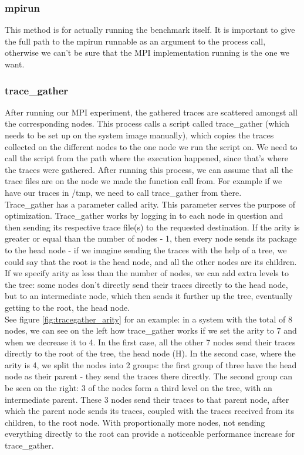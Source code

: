 \subsubsection{mpirun}
This method is for actually running the benchmark
itself. It is important to give the full path to the mpirun runnable
as an argument to the process call, otherwise we can't be sure that
the MPI implementation running is the one we want.
\subsubsection{trace\_gather}
\label{sec:trace_gather}
After running our MPI experiment, the gathered traces are scattered
amongst all the corresponding nodes. This process calls a script
called trace\_gather\cite{ms11} (which needs to be set up on the system
image manually), which copies the traces collected on the
different nodes to the one node we run the script on. We need to call
the script from the path where the execution happened, since that's
where the traces were gathered. After running
this process, we can assume that all the trace files are on the node
we made the function call from. For example if we have our traces in
/tmp, we need to call trace\_gather from there.\\
Trace\_gather has a parameter called arity. This parameter serves the
purpose of optimization. Trace\_gather
works by logging in to each node in question and then sending its
respective trace file(s) to the requested destination. If the arity is
greater or equal than the number of nodes - 1, then every node sends
its package to the head node - if we imagine sending the traces with
the help of a tree, we could say that the root is the head node, and
all the other nodes are its children. If we specify arity as less than
the number of nodes, we can add extra levels to the tree: some nodes
don't directly send their traces directly to the head node, but to an
intermediate node, which then sends it further up the tree, eventually
getting to the root, the head node.\\
See figure \ref{fig:tracegather_arity} for an example: in a system
with the total of 8 nodes, we can see on the left how trace\_gather
works if we set the arity to 7 and when we decrease it to 4. In the
first case, all the other 7 nodes send their traces directly to the
root of the tree, the head node (H). In the second case, where the
arity is 4, we split the nodes into 2 groups: the first group of three
have the head node as their parent - they send the traces there
directly. The second group can be seen on the right: 3 of the nodes
form a third level on the tree, with an intermediate parent. These 3
nodes send their traces to that parent node, after which the parent
node sends its traces, coupled with the traces received from its
children, to the root node. With proportionally more nodes, not
sending everything directly to the root can provide a noticeable
performance increase for trace\_gather.

